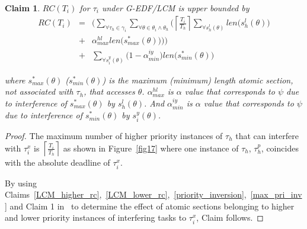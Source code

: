 \documentclass[conference]{IEEEtran}
\newtheorem{clm}{Claim}
\begin{document}
\begin{clm}\label{GEDF/LCM response time}
$RC(T_i)$ for $\tau_i$ under G-EDF/LCM is upper bounded by
\begin{eqnarray}
RC(T_i) & = & \Bigg(\sum_{\forall \tau_h \in \gamma_i}\sum_{\forall\theta \in \theta_i \wedge \theta_h}\Bigg(\left\lceil\frac{T_{i}}{T_{h}}\right\rceil\sum_{\forall s_{h}^{l}(\theta)}len\Big(s_{h}^{l}(\theta)\Big)\nonumber\\
& + & \alpha_{max}^{hl}len\Big(s_{max}^{*}(\theta)\Big)\Bigg)\Bigg)\nonumber\\
& + & \sum_{\forall s_{i}^{y}(\theta)}\Big(1-\alpha_{min}^{iy}\Big)len\Big(s_{min}^*(\theta)\Big)  
\label{eq78}\end{eqnarray} 

where $s_{max}^* (\theta)$ ($s_{min}^*(\theta)$) is the maximum (minimum) length atomic section, not associated with $\tau_h$, that accesses $\theta$. $\alpha_{max}^{hl}$ is $\alpha$ value that corresponds to $\psi$ due to interference of $s_{max}^*(\theta)$ by $s_h^l(\theta)$. And $\alpha_{min}^{iy}$ is $\alpha$ value that corresponds to $\psi$ due to interference of $s_{min}^*(\theta)$ by $s_i^y(\theta)$.
\end{clm}

\begin{proof}
The maximum number of higher priority instances of $\tau_h$ that can interfere with $\tau_i^x$ is $\left\lceil\frac{T_i}{T_h}\right\rceil$ as shown in Figure~\ref{fig17} where one instance of $\tau_h$, $\tau_h^p$, coincides with the absolute deadline of $\tau_i^x$.

By using Claims~\ref{LCM_higher_rc},~\ref{LCM_lower_rc},~\ref{priority_inversion},~\ref{max_pri_inv} and Claim 1 in~\cite{stmconcurrencycontrol:emsoft11} to determine the effect of atomic sections belonging to higher and lower priority instances of interfering tasks to $\tau_i^x$, Claim follows.
\end{proof}
\end{document}
